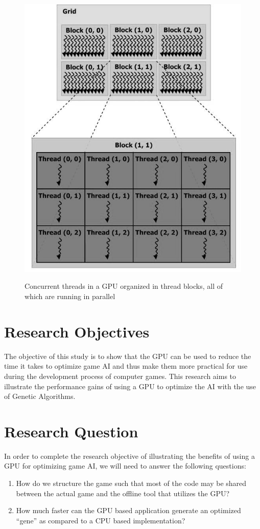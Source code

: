 \begin{figure}
	\centering
		\graphicspath{{images/}}
		\includegraphics[width=190 pt]{gpu.jpg}
	\caption{Concurrent threads in a GPU organized in thread blocks, all of which
are running in parallel}
	\cite{pdf:NVCudaPrgGuide}
	\label{fig:gpu_diagram}
\end{figure}

\section{Research Objectives}

The objective of this study is to show that the GPU can be used to reduce the time
it takes to optimize game AI and thus make them more practical for use during the
development process of computer games. This research aims to illustrate the
performance gains of using a GPU to optimize the AI with the use of Genetic Algorithms.


\section{Research Question}

In order to complete the research objective of illustrating the benefits of using
a GPU for optimizing game AI, we will need to answer the following questions:

\begin{enumerate}
 \item How do we structure the game such that most of the code may be shared between
the actual game and the offline tool that utilizes the GPU?

 \item How much faster can the GPU based application generate an optimized ``gene''
as compared to a CPU based implementation?
\end{enumerate}

